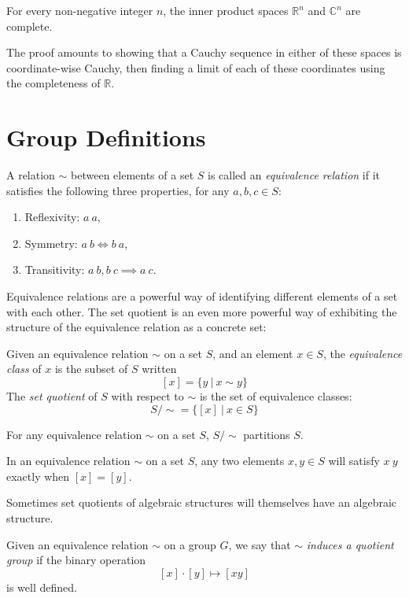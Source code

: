 \begin{prop}
	For every non-negative integer $n$, the inner product spaces $\mathbb{R}^n$ and $\mathbb{C}^n$ are complete.
\end{prop}
The proof amounts to showing that a Cauchy sequence in either of these spaces is coordinate-wise Cauchy, then finding a limit of each of these coordinates using the completeness of $\mathbb{R}$.

\section{Group Definitions}

\begin{define}
	A relation $\sim$ between elements of a set $S$ is called an \emph{equivalence relation} if it satisfies the following three properties, for any $a, b, c \in S$:
	\begin{enumerate}
		\item Reflexivity: $a ~ a$,
		\item Symmetry: $a ~ b \iff b ~ a$,
		\item Transitivity: $a ~ b, b ~ c \implies a ~ c$.
	\end{enumerate}
\end{define}

Equivalence relations are a powerful way of identifying different elements of a set with each other. The set quotient is an even more powerful way of exhibiting the structure of the equivalence relation as a concrete set:

\begin{define}
	Given an equivalence relation $\sim$ on a set $S$, and an element $x \in S$, the \emph{equivalence class} of $x$ is the subset of $S$ written
	\[[x] = \{y\ |\ x \sim y\}\]
	The \emph{set quotient} of $S$ with respect to $\sim$ is the set of equivalence classes:
	\[S/\sim = \{[x]\ |\ x \in S\}\]
\end{define}

\begin{prop}
	For any equivalence relation $\sim$ on a set $S$, $S/\sim$ partitions $S$.
\end{prop}

\begin{prop}
	In an equivalence relation $\sim$ on a set $S$, any two elements $x, y \in S$ will satisfy $x ~ y$ exactly when $[x] = [y]$.
\end{prop}

Sometimes set quotients of algebraic structures will themselves have an algebraic structure.
\begin{define}
	Given an equivalence relation $\sim$ on a group $G$, we say that $\sim$ \emph{induces a quotient group} if the binary operation
	\[[x]\cdot[y] \mapsto [xy]\]
	is well defined.
\end{define}

